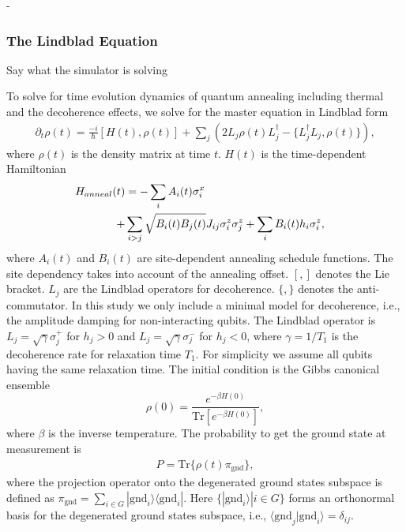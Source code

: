 -\documentclass[prd,twocolumn,tightenlines,preprintnumbers,showpacs,superscriptaddress,notitlepage,nofootinbib,eqsecnum,floatfix,longbibliography]{revtex4}
\begin{document}
\subsubsection{The Lindblad Equation}
\label{sec:methods:lindblad}
Say what the simulator is solving

{\color{blue}


To solve for time evolution dynamics of quantum annealing including thermal and the decoherence effects, we solve for the master equation in Lindblad form
\begin{align}
    \partial_t \rho (t) =  \frac{-i}{\hbar} [H(t) , \rho(t)] + \sum_j (2L_j \rho(t) L_j^\dagger - \{ L^\dagger_j L_j, \rho(t) \}) ,
\end{align}
where $\rho (t)$ is the density matrix at time $t$.
$H(t)$ is the time-dependent Hamiltonian
\begin{align}
    \label{eq:annealH}
     H_{anneal}(t)&  =  - \sum_i  A_i(t)\sigma^x_i & \notag \\
     +&  \sum_{i>j} \sqrt{B_{i}(t)B_{j}(t)} J_{ij} \sigma^z_i \sigma^z_j +\sum_i B_{i}(t) h_i \sigma^z_i  ,&
\end{align}
where $A_i(t)$ and $B_{i}(t)$ are site-dependent annealing schedule functions.
The site dependency takes into account of the annealing offset.
$[,]$ denotes the Lie bracket.
$L_j$ are the Lindblad operators for decoherence.
$\{, \}$ denotes the anti-commutator.
In this study we only include a minimal model for decoherence, i.e., the amplitude damping for non-interacting qubits.
The Lindblad operator is $L_j=\sqrt{\gamma} \sigma^{+}_j$ for $h_j>0$ and $L_j=\sqrt{\gamma} \sigma^{-}_j$ for $h_j<0$, where $\gamma = 1/T_1$ is the decoherence rate for relaxation time $T_1$.
For simplicity we assume all qubits having the same relaxation time.
The initial condition is the Gibbs canonical ensemble
\begin{equation}
    \rho (0) =  \frac{e^{-\beta H(0)}}{\mbox{Tr}[e^{-\beta H(0)}]} ,
\end{equation}
where $\beta$ is the inverse temperature.
The probability to get the ground state at measurement is
\begin{align}
    P =  \mbox{Tr} \{  \rho (t) \pi_{\mbox{gnd}} \}  ,
\end{align}
where the projection operator onto the degenerated ground states subspace is defined as $\pi_{\mbox{gnd}}=\sum_{i\in G} |\mbox{gnd}_i\rangle \langle \mbox{gnd}_i| $.
Here $\{ | \mbox{gnd}_i \rangle | i \in G \}$ forms an orthonormal basis for the degenerated ground states subspace, i.e., $\langle \mbox{gnd}_j | \mbox{gnd}_i \rangle = \delta_{ij}$.





}
\end{document}
